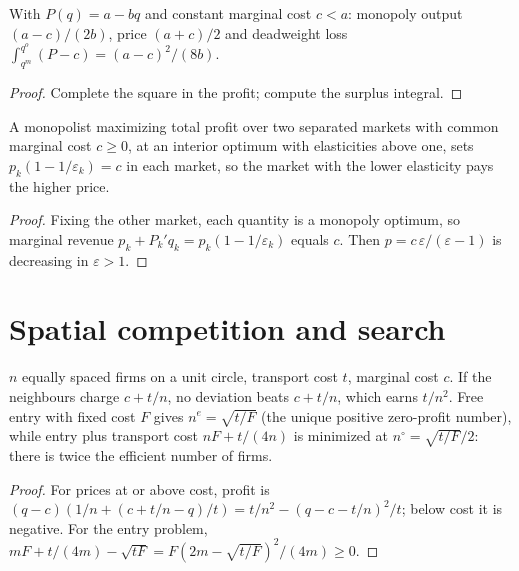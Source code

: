 \begin{theorem}
\label{thm:linear-monopoly}
\leanok
{}
With $P(q) = a - bq$ and constant marginal cost $c < a$: monopoly output $(a-c)/(2b)$, price $(a+c)/2$ and
deadweight loss $\int_{q^m}^{q^o}(P - c) = (a-c)^2/(8b)$.
\end{theorem}
\begin{proof}
\leanok
Complete the square in the profit; compute the surplus integral.
\end{proof}

\begin{theorem}
\label{thm:discrimination}
\leanok
{}
A monopolist maximizing total profit over two separated markets with common marginal cost $c \ge 0$, at an interior
optimum with elasticities above one, sets $p_k(1 - 1/\varepsilon_k) = c$ in each market, so the market with the lower
elasticity pays the higher price.
\end{theorem}
\begin{proof}
\leanok
Fixing the other market, each quantity is a monopoly optimum, so marginal revenue $p_k + P_k' q_k = p_k(1 - 1/\varepsilon_k)$
equals $c$. Then $p = c\,\varepsilon/(\varepsilon - 1)$ is decreasing in $\varepsilon > 1$.
\end{proof}

\section{Spatial competition and search}

\begin{theorem}
\label{thm:salop}
\leanok
$n$ equally spaced firms on a unit circle, transport cost $t$, marginal cost $c$. If the neighbours charge
$c + t/n$, no deviation beats $c + t/n$, which earns $t/n^2$. Free entry with fixed cost $F$ gives
$n^e = \sqrt{t/F}$ (the unique positive zero-profit number), while entry plus transport cost $nF + t/(4n)$ is minimized at $n^\circ = \sqrt{t/F}/2$:
there is twice the efficient number of firms.
\end{theorem}
\begin{proof}
\leanok
For prices at or above cost, profit is $(q-c)(1/n + (c + t/n - q)/t) = t/n^2 - (q - c - t/n)^2/t$; below cost it is
negative. For the entry problem, $mF + t/(4m) - \sqrt{tF} = F(2m - \sqrt{t/F})^2/(4m) \ge 0$.
\end{proof}

